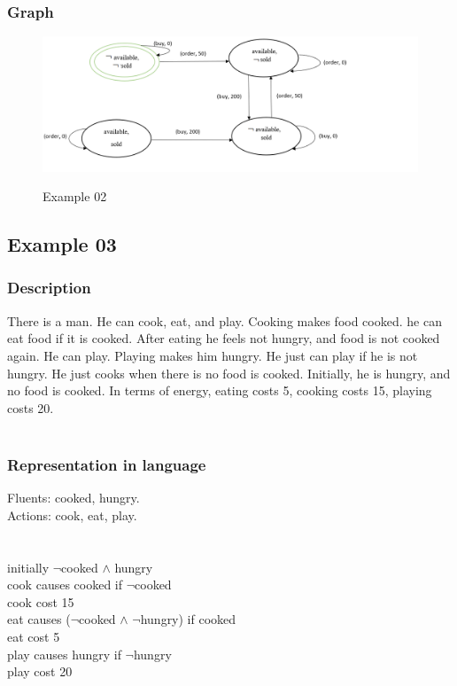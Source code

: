 \documentclass[11pt]{article}
\begin{document}
	\subsubsection{Graph}\label{par:p402}
	\begin{figure}[H]
		\includegraphics[width=1.2\linewidth, height=0.4\textheight]{./media/example2_graph.png}
		\label{Figure:f02}
		\caption{Example 02}
	\end{figure}
	\subsection{Example 03}
	\subsubsection{Description}\label{par:p103}
	There is a man. He can cook, eat, and play. Cooking makes food cooked. he can eat food if it is cooked. After eating he feels not hungry, and food is not cooked again. He can play. Playing makes him hungry. He just can play if he is not hungry. He just cooks when there is no food is cooked. Initially, he is hungry, and no food is cooked. In terms of energy, eating costs 5, cooking costs 15, playing costs 20.\\
	\\
	\subsubsection{Representation in language}\label{par:p203}
	Fluents: cooked, hungry.\\
	Actions: cook, eat, play.\\
	\\
	\\
	initially $\neg$cooked $\land$ hungry\\
	cook causes cooked if $\neg$cooked\\
	cook cost 15\\
	eat causes ($\neg$cooked $\land$ $\neg$hungry) if cooked\\
	eat cost 5\\
	play causes hungry if $\neg$hungry\\
	play cost 20\\
	\\
\end{document}
